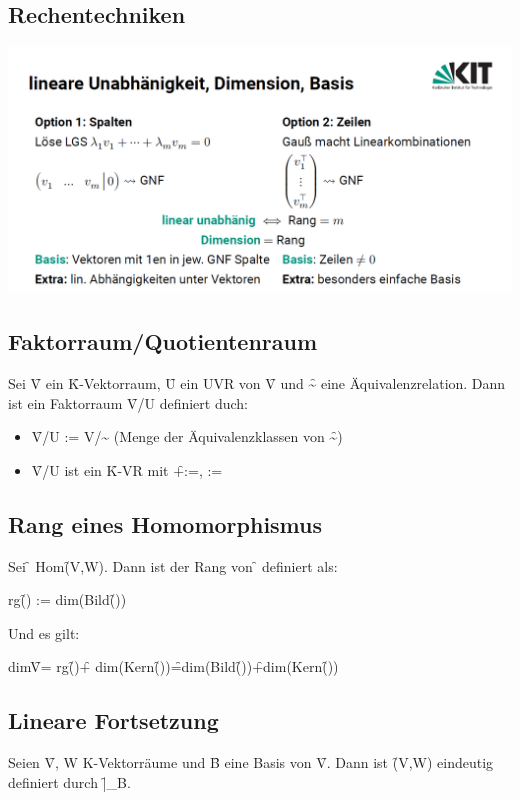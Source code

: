 \subsection{Rechentechniken}
\includegraphics*[width=\textwidth]{sections/Screenshot 2024-03-11 132518.png}



\subsection{Faktorraum/Quotientenraum}
Sei \f{V} ein \f{K}-Vektorraum, \f{U} ein UVR von \f{V} und \f{\sim} eine Äquivalenzrelation. Dann ist ein Faktorraum \f{V/U} definiert duch:
\begin{itemize}
    \item \f{V/U := V/\sim \quad} (Menge der Äquivalenzklassen von \f{\sim})
    \item \f{V/U} ist ein \f{K}-VR mit \f{\left[v\right] +\left[w\right] :=\left[v+w\right] , \lambda \left[v\right]  :=  }
\end{itemize}
\subsection{Rang eines Homomorphismus}
Sei \f{\Phi\in} Hom\f{(V,W)}. Dann ist der Rang von \f{\Phi} definiert als:
\begin{center}
    rg\f{(\Phi) :=} dim(Bild(\f{\Phi}))
\end{center} 
Und es gilt:
\begin{center}
    dim\f{V=} rg(\f{\Phi })\f{+} dim(Kern(\f{\Phi}))\f{=}dim(Bild(\f{\Phi}))\f{+}dim(Kern(\f{\Phi}))
\end{center}


\subsection{Lineare Fortsetzung}
Seien \f{V, W K}-Vektorräume und \f{B} eine Basis von \f{V}. Dann ist \f{\Phi\in{}(V,W)} eindeutig definiert durch \f{\Phi|_B}.


